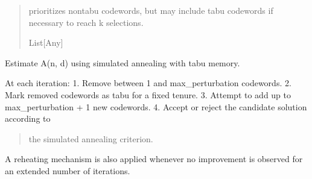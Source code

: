\documentclass[letterpaper,10pt,english]{sphinxmanual}
\begin{document}
\begin{fulllineitems}
\begin{quote}
\begin{description}
\begin{itemize}
\end{itemize}

\sphinxAtStartPar
\begin{description}
\sphinxAtStartPar
prioritizes non\sphinxhyphen{}tabu codewords, but may include tabu
codewords if necessary to reach k selections.

\end{description}


\sphinxAtStartPar
List{[}Any{]}

\end{description}\end{quote}

\end{fulllineitems}


\begin{fulllineitems}
\label{\detokenize{index:hammindist.functions.simulated_annealing}}
\pysigstartsignatures
\pysiglinewithargsret
{}
{\sphinxparamcomma {}\sphinxparamcomma {}\sphinxparamcomma {}\sphinxparamcomma {}\sphinxparamcomma {}\sphinxparamcomma {}\sphinxparamcomma {}}
{}
\pysigstopsignatures
\sphinxAtStartPar
Estimate A(n, d) using simulated annealing with tabu memory.

\sphinxAtStartPar
At each iteration:
1. Remove between 1 and max\_perturbation codewords.
2. Mark removed codewords as tabu for a fixed tenure.
3. Attempt to add up to max\_perturbation + 1 new codewords.
4. Accept or reject the candidate solution according to
\begin{quote}

\sphinxAtStartPar
the simulated annealing criterion.
\end{quote}

\sphinxAtStartPar
A reheating mechanism is also applied whenever no improvement
is observed for an extended number of iterations.

\end{fulllineitems}
\end{document}
